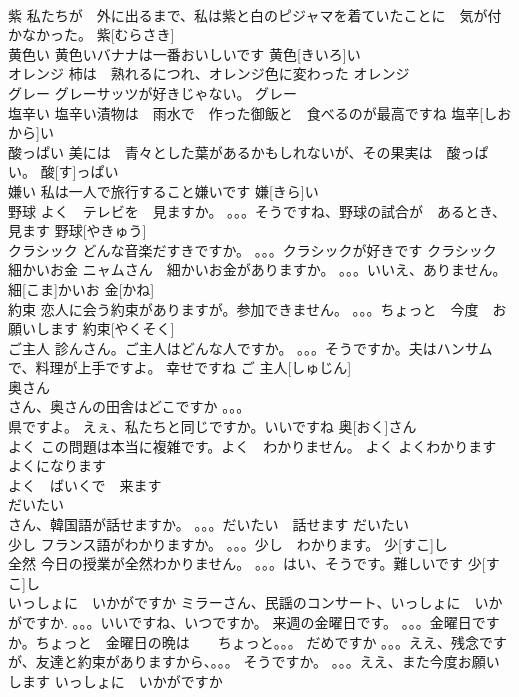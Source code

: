 \documentclass[8pt]{extreport}
\begin{document}
\begin{CJK}{UTF8}{min}
\\	紫	私たちが　外に出るまで、私は紫と白のピジャマを着ていたことに　気が付かなかった。	紫[むらさき]			
\\	黄色い	黄色いバナナは一番おいしいです	黄色[きいろ]い			
\\	オレンジ	柿は　熟れるにつれ、オレンジ色に変わった	オレンジ						
\\	グレー	グレーサッツが好きじゃない。	グレー			
\\	塩辛い	塩辛い漬物は　雨水で　作った御飯と　食べるのが最高ですね	塩辛[しおから]い			
\\	酸っぱい	美には　青々とした葉があるかもしれないが、その果実は　酸っぱい。	酸[す]っぱい			
\\	嫌い	私は一人で旅行すること嫌いです	嫌[きら]い			
\\	野球	よく　テレビを　見ますか。 。。。そうですね、野球の試合が　あるとき、見ます	野球[やきゅう]					
\\	クラシック	どんな音楽だすきですか。 。。。クラシックが好きです	クラシック						
\\	細かいお金	ニャムさん　細かいお金がありますか。 。。。いいえ、ありません。	細[こま]かいお 金[かね]					
\\	約束	恋人に会う約束がありますが。参加できません。 。。。ちょっと　今度　お願いします	約束[やくそく]			
\\	ご主人	診んさん。ご主人はどんな人ですか。 。。。そうですか。夫はハンサムで、料理が上手ですよ。 幸せですね	ご 主人[しゅじん]					
\\	奥さん	
\\	さん、奥さんの田舎はどこですか 。。。
\\	県ですよ。 えぇ、私たちと同じですか。いいですね	奥[おく]さん					
\\	よく	この問題は本当に複雑です。よく　わかりません。	よく			よくわかります　
\\	よくになります
\\	よく　ばいくで　来ます
\\	だいたい	
\\	さん、韓国語が話せますか。 。。。だいたい　話せます	だいたい			
\\	少し	フランス語がわかりますか。 。。。少し　わかります。	少[すこ]し					
\\	全然	今日の授業が全然わかりません。 。。。はい、そうです。難しいです	少[すこ]し			
\\	いっしょに　いかがですか	ミラーさん、民謡のコンサート、いっしょに　いかがですか. 。。。いいですね、いつですか。 来週の金曜日です。 。。。金曜日ですか。ちょっと　金曜日の晩は　　ちょっと。。。 だめですか 。。。ええ、残念ですが、友達と約束がありますから、。。。 そうですか。 。。。ええ、また今度お願いします	いっしょに　いかがですか			

\end{CJK}
\end{document}
